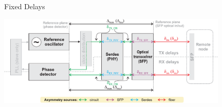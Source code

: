 \documentclass[compress,red]{beamer}
\begin{document}
\begin{frame}{Fixed Delays}

  \begin{center}
  \includegraphics[width=11.0cm]{protocol/asymmetries.pdf}
  \end{center}

\end{frame}
\end{document}
